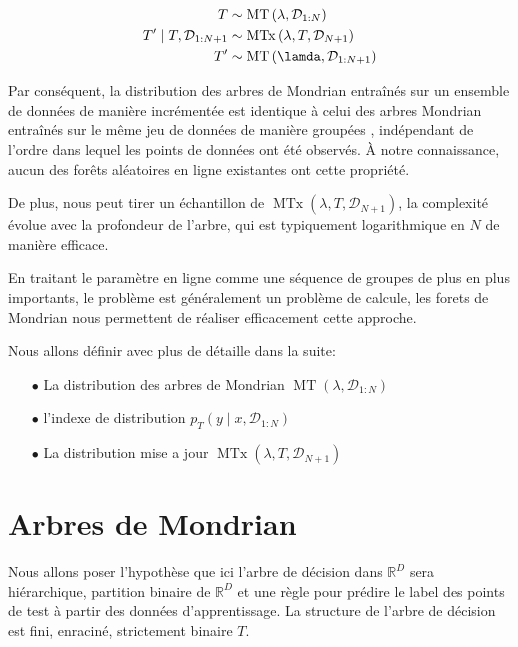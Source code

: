$$
\begin{aligned}
T & \sim \operatorname{MT}\left(\lambda, \mathcal{D}_{1: N}\right) \\
T^{\prime} \mid T, \mathcal{D}_{1: N+1} & \sim \operatorname{MTx}\left(\lambda, T, \mathcal{D}_{N+1}\right)\\
T^\prime &\sim \operatorname{MT}\left(\lamda,\mathcal{D}_{1:N+1}\right)
\end{aligned}
$$


Par conséquent, la distribution des arbres de Mondrian entraînés sur un ensemble de données de manière incrémentée est identique à celui des arbres Mondrian entraînés sur le même jeu de données de manière groupées , indépendant de l'ordre dans lequel les points de données ont été observés. À notre connaissance, aucun des forêts aléatoires en ligne existantes ont cette propriété.

De plus, nous peut tirer un échantillon de $\operatorname{MTx}\left(\lambda, T, \mathcal{D}_{N+1}\right)$, la complexité évolue avec la profondeur de l'arbre, qui est typiquement logarithmique en $N$ de manière efficace.

En traitant le paramètre en ligne comme une séquence de groupes de plus en plus importants, le problème est généralement un problème de calcule, les forets de Mondrian nous permettent de réaliser efficacement cette approche.

Nous allons définir avec plus de détaille dans la suite:
\begin{itemize}
    \item[$\bullet$] La distribution des arbres de Mondrian $\operatorname{MT}\left(\lambda, \mathcal{D}_{1: N}\right)$
    \item[$\bullet$] l'indexe de distribution $p_{T}\left(y \mid x, \mathcal{D}_{1: N}\right)$
    \item[$\bullet$] La distribution mise a jour $\operatorname{MTx}\left(\lambda, T, \mathcal{D}_{N+1}\right)$
\end{itemize}

\section{Arbres de Mondrian}
Nous allons poser l'hypothèse que ici l'arbre de décision dans $\mathbb{R}^D$ sera hiérarchique, partition binaire de $\mathbb{R}^D$ et une règle pour prédire le label des points de test à partir des données d'apprentissage. La structure de l'arbre de décision est  fini, enraciné, strictement binaire $T$.

